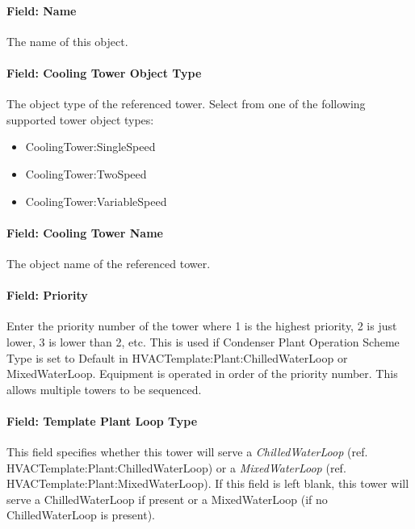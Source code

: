 \paragraph{Field: Name}\label{field-name-14-003}

The name of this object.

\paragraph{Field: Cooling Tower Object Type}\label{field-cooling-tower-object-type}

The object type of the referenced tower. Select from one of the following supported tower object types:

\begin{itemize}
\item
  CoolingTower:SingleSpeed
\item
  CoolingTower:TwoSpeed
\item
  CoolingTower:VariableSpeed
\end{itemize}

\paragraph{Field: Cooling Tower Name}\label{field-cooling-tower-name}

The object name of the referenced tower.

\paragraph{Field: Priority}\label{field-priority-3}

Enter the priority number of the tower where 1 is the highest priority, 2 is just lower, 3 is lower than 2, etc. This is used if Condenser Plant Operation Scheme Type is set to Default in HVACTemplate:Plant:ChilledWaterLoop or MixedWaterLoop. Equipment is operated in order of the priority number. This allows multiple towers to be sequenced.

\paragraph{Field: Template Plant Loop Type}\label{field-template-plant-loop-type-1}

This field specifies whether this tower will serve a \emph{ChilledWaterLoop} (ref. HVACTemplate:Plant:ChilledWaterLoop) or a \emph{MixedWaterLoop} (ref. HVACTemplate:Plant:MixedWaterLoop). If this field is left blank, this tower will serve a ChilledWaterLoop if present or a MixedWaterLoop (if no ChilledWaterLoop is present).

